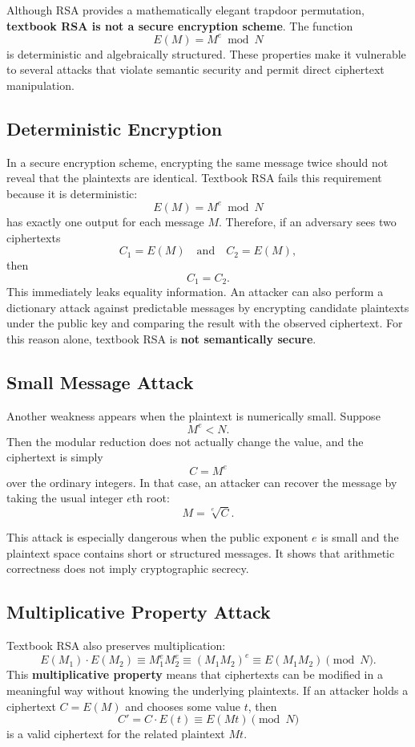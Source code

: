 Although RSA provides a mathematically elegant trapdoor permutation, \textbf{textbook RSA is not a secure encryption scheme}. The function
\[
E(M) = M^e \bmod N
\]
is deterministic and algebraically structured. These properties make it vulnerable to several attacks that violate semantic security and permit direct ciphertext manipulation.

\subsection{Deterministic Encryption}

In a secure encryption scheme, encrypting the same message twice should not reveal that the plaintexts are identical. Textbook RSA fails this requirement because it is deterministic:
\[
E(M) = M^e \bmod N
\]
has exactly one output for each message $M$. Therefore, if an adversary sees two ciphertexts
\[
C_1 = E(M) \quad \text{and} \quad C_2 = E(M),
\]
then
\[
C_1 = C_2.
\]
This immediately leaks equality information. An attacker can also perform a dictionary attack against predictable messages by encrypting candidate plaintexts under the public key and comparing the result with the observed ciphertext. For this reason alone, textbook RSA is \textbf{not semantically secure}.

\subsection{Small Message Attack}

Another weakness appears when the plaintext is numerically small. Suppose
\[
M^e < N.
\]
Then the modular reduction does not actually change the value, and the ciphertext is simply
\[
C = M^e
\]
over the ordinary integers. In that case, an attacker can recover the message by taking the usual integer $e$th root:
\[
M = \sqrt[e]{C}.
\]

This attack is especially dangerous when the public exponent $e$ is small and the plaintext space contains short or structured messages. It shows that arithmetic correctness does not imply cryptographic secrecy.

\subsection{Multiplicative Property Attack}

Textbook RSA also preserves multiplication:
\[
E(M_1)\cdot E(M_2) \equiv M_1^e M_2^e \equiv (M_1M_2)^e \equiv E(M_1M_2) \pmod{N}.
\]
This \textbf{multiplicative property} means that ciphertexts can be modified in a meaningful way without knowing the underlying plaintexts. If an attacker holds a ciphertext $C = E(M)$ and chooses some value $t$, then
\[
C' = C \cdot E(t) \equiv E(Mt) \pmod{N}
\]
is a valid ciphertext for the related plaintext $Mt$.

